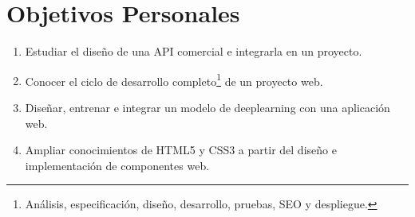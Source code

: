 \section{Objetivos Personales}
\begin{enumerate}
    \item
        Estudiar el diseño de una API comercial e integrarla en un proyecto.
    \item
        Conocer el ciclo de desarrollo completo\footnote{Análisis, especificación, diseño, desarrollo, pruebas, SEO y despliegue.} de un proyecto web.
    \item
        Diseñar, entrenar e integrar un modelo de deeplearning  con una aplicación web.
    \item
        Ampliar conocimientos de HTML5 y CSS3 a partir del diseño e implementación de componentes web. 
\end{enumerate}
    
